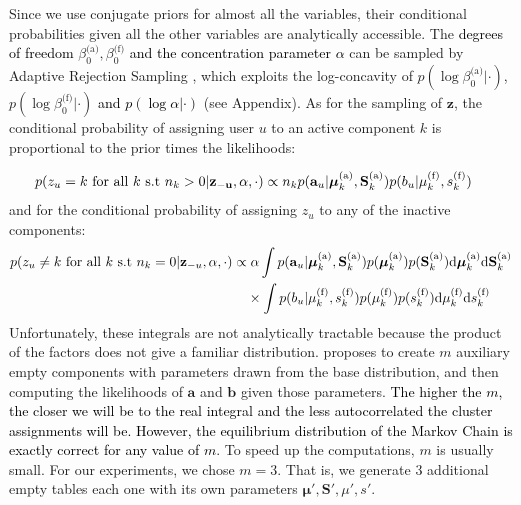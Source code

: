 \documentclass[smallextended]{svjour3}          %
\newcommand\alberto[1]{\textcolor{black}{#1}}
\newcommand{\betaoa}{\beta_{0}^\text{(a)}}
\newcommand{\betaof}{\beta_{0}^\text{(f)}}
\newcommand{\Muk}{\boldsymbol{\mu}_{k}^\text{(a)}}
\newcommand{\Sk}{\mathbf{S}_{k}^\text{(a)}}
\newcommand{\muk}{\mu_{k}^\text{(f)}}
\newcommand{\sk}{s_{k}^\text{(f)}}
\begin{document}
Since we use conjugate priors for almost all the variables, their conditional probabilities given all the other variables are analytically accessible. The \alberto{degrees of freedom} $\betaoa, \betaof$ \alberto{and the concentration parameter $\alpha$} can be sampled by Adaptive Rejection Sampling \citep{Gilks1992}, which exploits the log-concavity of  $p(\log \beta_0^{\text{(a)}} | \cdot)$,  $p(\log \beta_0^{\text{(f)}} | \cdot)$ \alberto{and $p(\log \alpha | \cdot)$} (see Appendix). As for the sampling of $\mathbf{z}$, the conditional probability of assigning user $u$ to an active component $k$ is proportional to the prior times the likelihoods:

\begin{align}
p(z_u = k  &\text{ for all } k \text{ s.t } n_{k}>0 | \mathbf{z_{-u}}, \alpha, \cdot)
\propto 
n_{k}
   p(\mathbf{a}_{\alberto{u}} |\Muk, \Sk)    
   p({\alberto{b_u}} | \muk, \sk) 
\end{align}
and for the conditional probability of assigning $z_u$ to any of the inactive components:
\begin{align}
p(z_u \neq k \text{ for all } k \text{ s.t } n_{k}=0 | \mathbf{z}_{-u}, \alpha, \cdot)
\propto&
\;\alpha 
   \int 
   p(\mathbf{a}_{\alberto{u}} |\Muk, \Sk)  p(\Muk) p(\Sk)      
   \text{d}\Muk
   \text{d}\Sk\notag\\
   &\times
   \int 
   p(\alberto{b_u} | \muk, \sk)
   p(\muk)p(\sk) 
   \text{d}\muk
   \text{d}\sk
\end{align}
Unfortunately, these integrals are not analytically tractable because the product of the factors does not give a familiar distribution. \cite{Neal2000} proposes to create $m$ auxiliary empty components with parameters drawn from the base distribution, and then computing the likelihoods of $\mathbf{a}$ and $\mathbf{b}$ given those parameters. \alberto{The higher the $m$, the closer we will be to the real integral and the less autocorrelated the cluster assignments will be. However, the equilibrium distribution of the Markov Chain is exactly correct for any value of $m$}. To speed up the computations, $m$ is usually small. For our experiments, we chose $m=3$. That is, we generate $3$ additional empty tables each one with its own parameters  $\boldsymbol{\mu'}, \mathbf{S'}, \mu', s'$.
\end{document}
